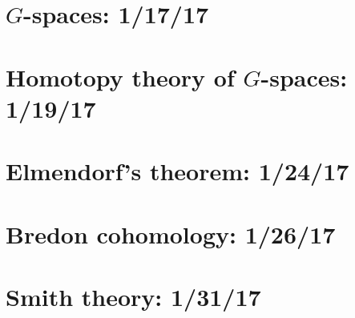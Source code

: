 \documentclass{style_EHT}
\begin{document}
\frontstuff

\section{$G$-spaces: 1/17/17}
	
\section{Homotopy theory of $G$-spaces: 1/19/17}
	
\section{Elmendorf's theorem: 1/24/17}
	
\section{Bredon cohomology: 1/26/17}
	
\section{Smith theory: 1/31/17}
	



{}

\end{document}
